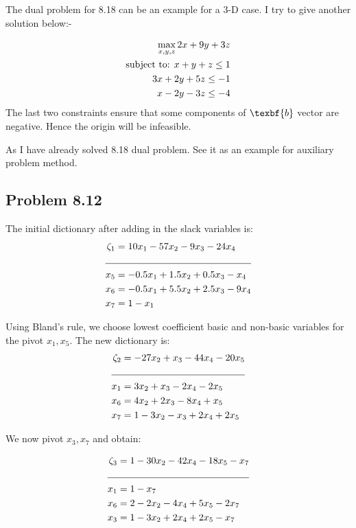 \documentclass[letterpaper,12pt]{article}
\theoremstyle{definition}
\begin{document}
The dual problem for 8.18 can be an example for a 3-D case. I try to give another solution below:-

\begin{align*}
  \max_{{x,y,z}} 2x+ 9y+ 3z\\
  \textnormal{subject to: } x + y + z\leq 1\\
   3x + 2y+ 5z\leq -1 \\
   x - 2y -3z\leq -4
\end{align*}
The last two constraints ensure that some components of $\texbf{b}$  vector are negative. Hence the origin will be infeasible.

As I have already solved 8.18 dual problem. See it as an example for auxiliary problem method.

\subsection*{Problem 8.12 }

The initial dictionary after adding in the slack variables is:
\begin{align*}
  \zeta_1 &= 10x_1-57x_2-9x_3-24x_4\\
  \cline{1-2}
  x_5 &= -0.5x_1 + 1.5x_2+0.5x_3-x_4\\
  x_6 &= -0.5x_1+5.5x_2 + 2.5x_3 -9x_4\\
  x_7 &= 1-x_1\\
\end{align*}

Using Bland's rule, we choose lowest coefficient basic and non-basic  variables for the pivot $x_1, x_5$. The new dictionary is:
\begin{align*}
  \zeta_2 &= -27x_2+x_3-44x_4 - 20x_5\\
  \cline{1-2}
  x_1 &= 3x_2 + x_3 -2x_4-2x_5\\
  x_6 &= 4x_2+2x_3-8x_4+x_5\\
  x_7 &= 1-3x_2-x_3+2x_4+2x_5\\
\end{align*}

We now pivot $x_3, x_7$ and obtain:

\begin{align*}
  \zeta_3 &= 1-30x_2-42x_4-18x_5-x_7\\
  \cline{1-2}
  x_1 &= 1-x_7 \\
  x_6 &= 2-2x_2-4x_4+5x_5-2x_7 \\
  x_3 &= 1-3x_2+2x_4+2x_5-x_7 \\
\end{align*}
\end{document}
